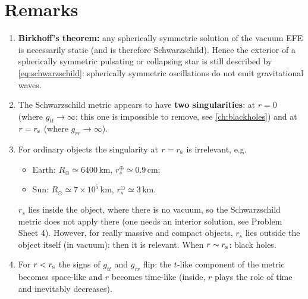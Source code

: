 \section{Remarks}

\begin{enumerate}
\item \textbf{Birkhoff's theorem:} any spherically symmetric solution of the vacuum EFE is necessarily static (and is therefore Schwarzschild). Hence the exterior of a spherically symmetric pulsating or collapsing star is still described by \eqref{eq:schwarzschild}: spherically symmetric oscillations do not emit gravitational waves.
\item The Schwarzschild metric appears to have \textbf{two singularities}: at $r=0$ (where $g_{tt}\to\infty$; this one is impossible to remove, see \cref{ch:blackholes}) and at $r=r_{\mathrm s}$ (where $g_{rr}\to\infty$).
\item For ordinary objects the singularity at $r=r_{\mathrm s}$ is irrelevant, e.g.
\begin{itemize}[nosep]
\item Earth: $R_\oplus\simeq6400$\,km, $r_s^\oplus\simeq0.9$\,cm;
\item Sun: $R_\odot\simeq7\times10^5$\,km, $r_s^\odot\simeq3$\,km.
\end{itemize}
$r_s$ lies inside the object, where there is no vacuum, so the Schwarzschild metric does not apply there (one needs an interior solution, see Problem Sheet 4). However, for really massive and compact objects, $r_s$ lies outside the object itself (in vacuum): then it is relevant. When $r\sim r_{\mathrm s}$: black holes.
\item For $r<r_{\mathrm s}$ the signs of $g_{tt}$ and $g_{rr}$ flip: the $t$-like component of the metric becomes space-like and $r$ becomes time-like (inside, $r$ plays the role of time and inevitably decreases).
\end{enumerate}

